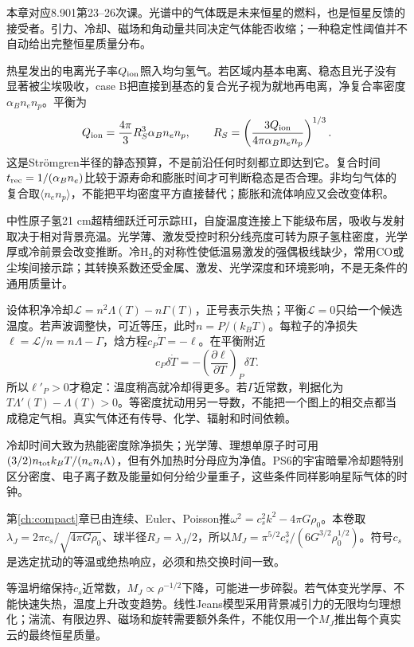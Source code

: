 本章对应8.901第23--26次课。光谱中的气体既是未来恒星的燃料，也是恒星反馈的接受者。引力、冷却、磁场和角动量共同决定气体能否收缩；一种稳定性阈值并不自动给出完整恒星质量分布。

热星发出的电离光子率$Q_{\rm ion}$照入均匀氢气。若区域内基本电离、稳态且光子没有显著被尘埃吸收，case B把直接到基态的复合光子视为就地再电离，净复合率密度$\alpha_Bn_en_p$。平衡为
\[
 Q_{\rm ion}=\frac{4\pi}3R_S^3\alpha_Bn_en_p,\qquad
 R_S=\left(\frac{3Q_{\rm ion}}{4\pi\alpha_Bn_en_p}\right)^{1/3}.
\]
这是Strömgren半径的静态预算，不是前沿任何时刻都立即达到它。复合时间$t_{\rm rec}=1/(\alpha_Bn_e)$比较于源寿命和膨胀时间才可判断稳态是否合理。非均匀气体的复合取$\langle n_en_p\rangle$，不能把平均密度平方直接替代；膨胀和流体响应又会改变体积。

中性原子氢21 cm超精细跃迁可示踪HI，自旋温度连接上下能级布居，吸收与发射取决于相对背景亮温。光学薄、激发受控时积分线亮度可转为原子氢柱密度，光学厚或冷前景会改变推断。冷H$_2$的对称性使低温易激发的强偶极线缺少，常用CO或尘埃间接示踪；其转换系数还受金属、激发、光学深度和环境影响，不是无条件的通用质量计。

设体积净冷却$\mathcal L=n^2\Lambda(T)-n\Gamma(T)$，正号表示失热；平衡$\mathcal L=0$只给一个候选温度。若声波调整快，可近等压，此时$n=P/(k_BT)$。每粒子的净损失$\ell=\mathcal L/n=n\Lambda-\Gamma$，焓方程$c_P\dot T=-\ell$。在平衡附近
\[
 c_P\delta\dot T=-\left(\frac{\partial\ell}{\partial T}\right)_P\delta T.
\]
所以$\ell'_P>0$才稳定：温度稍高就冷却得更多。若$\Gamma$近常数，判据化为$T\Lambda'(T)-\Lambda(T)>0$。等密度扰动用另一导数，不能把一个图上的相交点都当成稳定气相。真实气体还有传导、化学、辐射和时间依赖。

冷却时间大致为热能密度除净损失；光学薄、理想单原子时可用$(3/2)n_{\rm tot}k_BT/(n_en_i\Lambda)$，但有外加热时分母应为净值。PS6的宇宙暗晕冷却题特别区分密度、电子离子数及能量如何分给少量重子，这些条件同样影响星际气体的时钟。

第\ref{ch:compact}章已由连续、Euler、Poisson推$\omega^2=c_s^2k^2-4\pi G\rho_0$。本卷取$\lambda_J=2\pi c_s/\sqrt{4\pi G\rho_0}$、球半径$R_J=\lambda_J/2$，所以$M_J=\pi^{5/2}c_s^3/(6G^{3/2}\rho_0^{1/2})$。符号$c_s$是选定扰动的等温或绝热响应，必须和热交换时间一致。

等温坍缩保持$c_s$近常数，$M_J\propto\rho^{-1/2}$下降，可能进一步碎裂。若气体变光学厚、不能快速失热，温度上升改变趋势。线性Jeans模型采用背景减引力的无限均匀理想化；湍流、有限边界、磁场和旋转需要额外条件，不能仅用一个$M_J$推出每个真实云的最终恒星质量。

